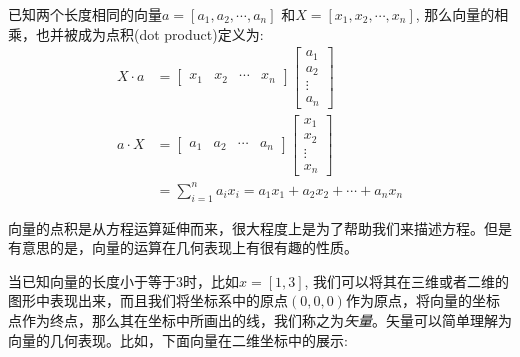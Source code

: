 \documentclass[12pt]{article}
\numberwithin{figure}{section}
\numberwithin{equation}{section}
\begin{document}
\begin{definition}
	已知两个长度相同的向量$a=[a_1, a_2, \cdots, a_n]$ 和$X = [x_1, x_2, \cdots, x_n]$, 那么向量的相乘，也并被成为点积(dot product)定义为:
\begin{align*}
		 X \cdot a & = \begin{bmatrix}
		x_1 & x_2 & \cdots & x_n
	\end{bmatrix} \begin{bmatrix}
		a_1 \\
		a_2 \\
		\vdots \\
		a_n
	\end{bmatrix} \\
	 a \cdot X & = \begin{bmatrix}
		a_1 & a_2 & \cdots & a_n
	\end{bmatrix} \begin{bmatrix}
		x_1 \\
		x_2 \\
		\vdots \\
		x_n
	\end{bmatrix}\\
	& =  \sum_{i=1}^n a_i x_i = a_1 x_1 + a_2 x_2 + \cdots + a_n x_n 
\end{align*}
\end{definition}

\begin{remark}
向量的点积是从方程运算延伸而来，很大程度上是为了帮助我们来描述方程。但是有意思的是，向量的运算在几何表现上有很有趣的性质。	
\end{remark}

\begin{definition}
	当已知向量的长度小于等于$3$时，比如$x = [1, 3]$, 我们可以将其在三维或者二维的图形中表现出来，而且我们将坐标系中的原点$(0, 0, 0)$作为原点，将向量的坐标点作为终点，那么其在坐标中所画出的线，我们称之为\textit{矢量}。矢量可以简单理解为向量的几何表现。比如，下面向量在二维坐标中的展示:
\begin{figure}[H]
	\centering
\end{figure}
\end{definition}
\end{document}

